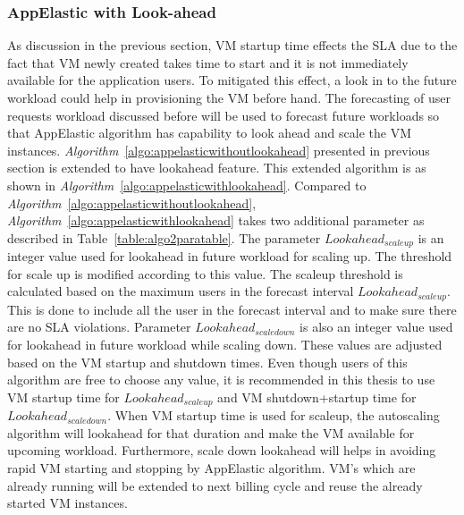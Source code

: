 \subsubsection{AppElastic with Look-ahead}
\label{subs:AppElastic with Look-ahead}
As discussion in the previous section, VM startup time effects the SLA due to the fact that VM newly created takes time to start and  it is not immediately available for the application users. To mitigated this effect, a look in to the future workload could help in provisioning the VM before hand. The forecasting of user requests workload discussed before will be used to forecast future workloads so that AppElastic algorithm has capability to look ahead and scale the VM instances. \textit{Algorithm}~\ref{algo:appelasticwithoutlookahead} presented in previous section is extended to have lookahead feature. This extended algorithm is as shown in  \textit{Algorithm}~\ref{algo:appelasticwithlookahead}. Compared to  \textit{Algorithm}~\ref{algo:appelasticwithoutlookahead}, \textit{Algorithm}~\ref{algo:appelasticwithlookahead} takes two additional parameter as described in Table~\ref{table:algo2paratable}. The parameter \( Lookahead_{scaleup} \) is an integer value used for lookahead in future workload for scaling  up. The threshold for scale up is modified according to this value. The scaleup threshold is calculated based on the maximum users in the forecast interval \( Lookahead_{scaleup} \). This is done to include all the user in the forecast interval and to make sure there are no SLA violations. Parameter \( Lookahead_{scaledown} \) is also an integer value used for lookahead in future workload while scaling down. These values are adjusted based on the VM startup and shutdown times. Even though users of this algorithm are free to choose any value, it is recommended in this thesis to use VM startup time for \( Lookahead_{scaleup} \) and VM shutdown+startup time for \( Lookahead_{scaledown} \). When VM startup time is used for scaleup, the autoscaling algorithm will lookahead for that duration and make the VM available for upcoming workload. Furthermore, scale down lookahead will helps in avoiding rapid VM starting and stopping by AppElastic algorithm. VM's which are already running will be extended to next billing cycle and reuse the already started VM instances.


\begin{flushleft}
  \begin{table}
    \caption{Additional input parameters to \textit{Algorithm}~\ref{algo:appelasticwithlookahead}}
     \label{table:algo2paratable}
\end{table}
\end{flushleft}

